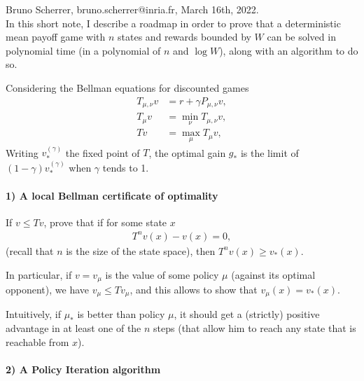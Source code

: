 \documentclass{article}
\begin{document}
Bruno Scherrer, bruno.scherrer@inria.fr, March 16th, 2022.
~\\

In this short note, I describe a roadmap in order to prove that a deterministic mean payoff game with $n$ states and rewards bounded by $W$ can be solved in polynomial time (in a polynomial of $n$ and $\log W$), along with an algorithm to do so.

Considering the Bellman equations for discounted games
\begin{align}
  T_{\mu,\nu}v &= r + \gamma P_{\mu,\nu}v, \\
  T_{\mu}v & = \min_\nu T_{\mu,\nu}v, \\
  T v &= \max_\mu T_{\mu}v,
\end{align}
Writing $v^{(\gamma)}_*$ the fixed point of $T$, the optimal gain $g_*$ is the limit of $(1-\gamma)v^{(\gamma)}_*$ when $\gamma$ tends to 1.

\paragraph{1) A local Bellman certificate of optimality}

If $v\le Tv$, prove that if for some state $x$
\begin{align}
  T^n v(x)-v(x)=0,
\end{align}
(recall that $n$ is the size of the state space), then $T^n v(x) \ge v_*(x)$.

In particular, if $v=v_\mu$ is the value of some policy $\mu$ (against its optimal opponent), we have $v_\mu \le T v_\mu$, and this allows to show that $v_\mu(x)=v_*(x)$.

Intuitively, if $\mu_*$ is better than policy $\mu$, it should get a (strictly) positive advantage in at least one of the $n$ steps (that allow him to reach any state that is reachable from $x$).

\paragraph{2) A Policy Iteration algorithm}
\end{document}
